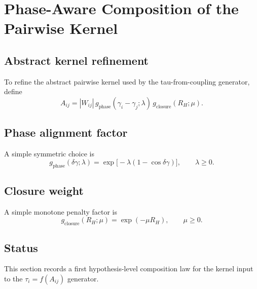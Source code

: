\section{Phase-Aware Composition of the Pairwise Kernel}
\label{sec:phase-aware-kernel}

\subsection{Abstract kernel refinement}
To refine the abstract pairwise kernel used by the tau-from-coupling generator, define
\begin{equation}
A_{ij}=|W_{ij}|\,g_{\mathrm{phase}}(\gamma_i-\gamma_j;\lambda)\,g_{\mathrm{closure}}(R_H;\mu).
\end{equation}

\subsection{Phase alignment factor}
A simple symmetric choice is
\begin{equation}
g_{\mathrm{phase}}(\delta\gamma;\lambda)=\exp\!\big[-\lambda(1-\cos\delta\gamma)\big],
\qquad \lambda\ge 0.
\end{equation}

\subsection{Closure weight}
A simple monotone penalty factor is
\begin{equation}
g_{\mathrm{closure}}(R_H;\mu)=\exp(-\mu R_H),
\qquad \mu\ge 0.
\end{equation}

\subsection{Status}
This section records a first hypothesis-level composition law for the kernel input to the \(\tau_i=f(A_{ij})\) generator.

